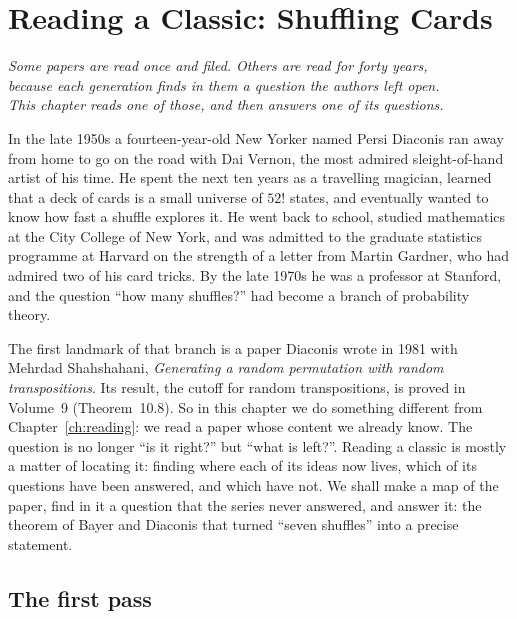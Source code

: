 \chapter{Reading a Classic: Shuffling Cards}
\label{ch:shuffling}

\begin{center}\itshape
Some papers are read once and filed. Others are read for forty years,\\
because each generation finds in them a question the authors left open.\\
This chapter reads one of those, and then answers one of its questions.
\end{center}

In the late 1950s a fourteen-year-old New Yorker named Persi Diaconis ran away from home to go on the road with Dai Vernon, the most
admired sleight-of-hand artist of his time. He spent the next ten years as a travelling magician, learned that a deck of cards is a
small universe of $52!$ states, and eventually wanted to know how fast a shuffle explores it. He went back to school, studied
mathematics at the City College of New York, and was admitted to the graduate statistics programme at Harvard on the strength of a letter
from Martin Gardner, who had admired two of his card tricks. By the late 1970s he was a professor at Stanford, and the question ``how many
shuffles?'' had become a branch of probability theory.

The first landmark of that branch is a paper Diaconis wrote in 1981 with Mehrdad Shahshahani, \emph{Generating a random permutation with random
transpositions}. Its result, the cutoff for random transpositions, is proved in Volume~9 (Theorem~10.8). So in this chapter we do something
different from Chapter~\ref{ch:reading}: we read a paper whose content we already know. The question is no longer ``is it right?'' but ``what is
left?''. Reading a classic is mostly a matter of locating it: finding where each of its ideas now lives, which of its questions have been
answered, and which have not. We shall make a map of the paper, find in it a question that the series never answered, and answer it: the
theorem of Bayer and Diaconis that turned ``seven shuffles'' into a precise statement.

\section{The first pass}

